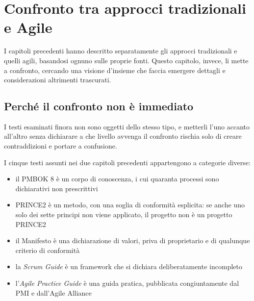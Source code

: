 %
%

\chapter{Confronto tra approcci tradizionali e Agile}
\label{cap:confronto}

I capitoli precedenti hanno descritto separatamente gli approcci
tradizionali e quelli agili, basandosi ognuno sulle proprie fonti.
Questo capitolo, invece, li mette a confronto, cercando una visione d'insieme
che faccia emergere dettagli e considerazioni altrimenti trascurati.


\section{Perch\'e il confronto non \`e immediato}
\label{sec:regole}

I testi esaminati finora non sono oggetti dello stesso
tipo, e metterli l'uno accanto all'altro senza dichiarare a che livello
avvenga il confronto rischia solo di creare contraddizioni e portare a confusione.

I cinque testi assunti nei due capitoli precedenti appartengono a categorie
diverse:
\begin {itemize}
\item il PMBOK 8 \`e un corpo di conoscenza, i cui quaranta processi sono
dichiarativi non prescrittivi
\item PRINCE2 \`e un metodo, con una soglia di conformit\`a esplicita: se anche
uno solo dei sette principi non viene applicato, il progetto non \`e un
progetto PRINCE2
\item il Manifesto \`e una dichiarazione di valori, priva di proprietario e di
qualunque criterio di conformit\`a
\item la \emph{Scrum Guide} \`e un framework che si dichiara deliberatamente
incompleto
\item l'\emph{Agile Practice Guide} \`e una guida pratica, pubblicata
congiuntamente dal PMI e dall'Agile Alliance
\end {itemize}

